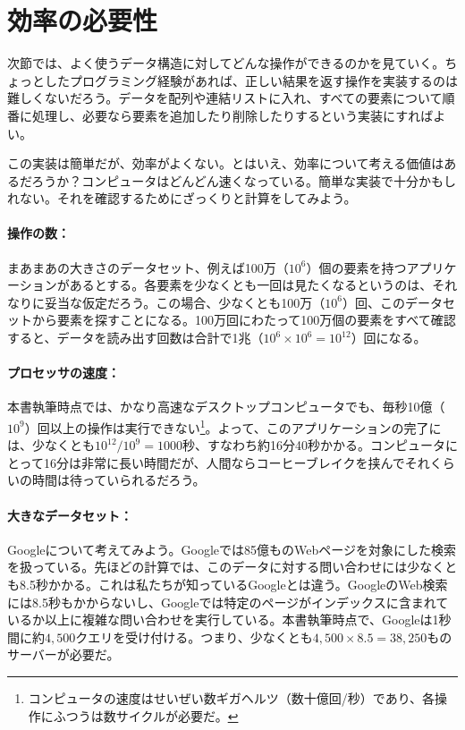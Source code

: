 \section{効率の必要性}

次節では、よく使うデータ構造に対してどんな操作ができるのかを見ていく。ちょっとしたプログラミング経験があれば、正しい結果を返す操作を実装するのは難しくないだろう。データを配列や連結リストに入れ、すべての要素について順番に処理し、必要なら要素を追加したり削除したりするという実装にすればよい。

この実装は簡単だが、効率がよくない。とはいえ、効率について考える価値はあるだろうか？コンピュータはどんどん速くなっている。簡単な実装で十分かもしれない。それを確認するためにざっくりと計算をしてみよう。

\paragraph{操作の数：}
まあまあの大きさのデータセット、例えば100万（$10^6$）個の要素を持つアプリケーションがあるとする。各要素を少なくとも一回は見たくなるというのは、それなりに妥当な仮定だろう。この場合、少なくとも100万（$10^6$）回、このデータセットから要素を探すことになる。100万回にわたって100万個の要素をすべて確認すると、データを読み出す回数は合計で1兆（$10^6\times 10^6=10^{12}$）回になる。

\paragraph{プロセッサの速度：}
本書執筆時点では、かなり高速なデスクトップコンピュータでも、毎秒10億（$10^9$）回以上の操作は実行できない\footnote{コンピュータの速度はせいぜい数ギガヘルツ（数十億回/秒）であり、各操作にふつうは数サイクルが必要だ。}。よって、このアプリケーションの完了には、少なくとも$10^{12}/10^9=1000$秒、すなわち約16分40秒かかる。コンピュータにとって16分は非常に長い時間だが、人間ならコーヒーブレイクを挟んでそれくらいの時間は待っていられるだろう。

\paragraph{大きなデータセット：}
Googleについて考えてみよう。Googleでは85億ものWebページを対象にした検索を扱っている。先ほどの計算では、このデータに対する問い合わせには少なくとも8.5秒かかる。これは私たちが知っているGoogleとは違う。GoogleのWeb検索には8.5秒もかからないし、Googleでは特定のページがインデックスに含まれているか以上に複雑な問い合わせを実行している。本書執筆時点で、Googleは1秒間に約$4,500$クエリを受け付ける。つまり、少なくとも$4,500 \times 8.5 = 38,250$ものサーバーが必要だ。

